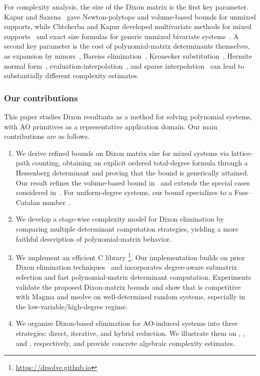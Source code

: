For complexity analysis, the size of the Dixon matrix is the first key parameter. Kapur and Saxena~\cite{DBLP:conf/stoc/KapurS96} gave Newton-polytope and volume-based bounds for unmixed supports, while Chtcherba and Kapur developed multivariate methods for mixed supports~\cite{ChtcherbaKapur2004} and exact size formulas for generic unmixed bivariate systems~\cite{ChtcherbaKapur2004Bivariate}. A second key parameter is the cost of polynomial-matrix determinants themselves, as expansion by minors~\cite{GentlemanJohnson1976}, Bareiss elimination~\cite{HorowitzSahni1975}, Kronecker substitution~\cite{Li2007symbolic}, Hermite normal form~\cite{DBLP:journals/jc/LabahnNZ17}, evaluation-interpolation~\cite{HorowitzSahni1975}, and sparse interpolation~\cite{DBLP:journals/jsc/Huang23} can lead to substantially different complexity estimates.

\subsubsection*{Our contributions}
This paper studies Dixon resultants as a method for solving polynomial systems, with AO primitives as a representative application domain. Our main contributions are as follows.

\begin{enumerate}
    \item We derive refined bounds on Dixon matrix size for mixed systems via lattice-path counting, obtaining an explicit ordered total-degree formula through a Hessenberg determinant and proving that the bound is generically attained. Our result refines the volume-based bound in~\cite{DBLP:conf/stoc/KapurS96} and extends the special cases considered in~\cite{ChtcherbaKapur2004Bivariate,cryptoeprint:2005/312}.
    For uniform-degree systems, our bound specializes to a Fuss--Catalan number~\cite{hilton1991catalan,DBLP:journals/dm/Aval08}.
    
    \item We develop a stage-wise complexity model for Dixon elimination by comparing multiple determinant computation strategies, yielding a more faithful description of polynomial-matrix behavior.
    
    \item We implement an efficient C library \drsolve\footnote{\url{https://drsolve.github.io}}. Our implementation builds on prior Dixon elimination techniques~\cite{DBLP:conf/issac/KapurSY94,cryptoeprint:2005/312,Albrecht2008} and incorporates degree-aware submatrix selection and fast polynomial-matrix determinant computation. Experiments validate the proposed Dixon-matrix bounds and show that \drsolve is competitive with Magma and msolve on well-determined random systems, especially in the low-variable/high-degree regime.
    
    \item We organize Dixon-based elimination for AO-induced systems into three strategies: direct, iterative, and hybrid reduction. We illustrate them on \poseidon, \vision, and \xhash, respectively, and provide concrete algebraic complexity estimates.
\end{enumerate}

